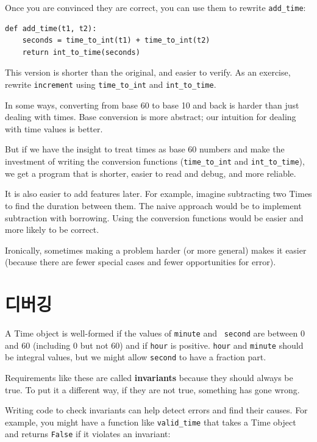 \documentclass[10pt]{book}
\begin{document}
Once you are convinced they are correct, you can use them to 
rewrite \verb"add_time":

\begin{verbatim}
def add_time(t1, t2):
    seconds = time_to_int(t1) + time_to_int(t2)
    return int_to_time(seconds)
\end{verbatim}
%
This version is shorter than the original, and easier to verify.  As
an exercise, rewrite {\tt increment} using \verb"time_to_int" and
\verb"int_to_time".

In some ways, converting from base 60 to base 10 and back is harder
than just dealing with times.  Base conversion is more abstract; our
intuition for dealing with time values is better.

But if we have the insight to treat times as base 60 numbers and make
the investment of writing the conversion functions (\verb"time_to_int"
and \verb"int_to_time"), we get a program that is shorter, easier to
read and debug, and more reliable.

It is also easier to add features later.  For example, imagine
subtracting two Times to find the duration between them.  The
naive approach would be to implement subtraction with borrowing.
Using the conversion functions would be easier and more likely to be
correct.

Ironically, sometimes making a problem harder (or more general) makes it
easier (because there are fewer special cases and fewer opportunities
for error).


\section{디버깅}

A Time object is well-formed if the values of {\tt minute} and {\tt
second} are between 0 and 60 (including 0 but not 60) and if 
{\tt hour} is positive.  {\tt hour} and {\tt minute} should be
integral values, but we might allow {\tt second} to have a
fraction part.

Requirements like these are called {\bf invariants} because
they should always be true.  To put it a different way, if they
are not true, something has gone wrong.

Writing code to check invariants can help detect errors
and find their causes.  For example, you might have a function
like \verb"valid_time" that takes a Time object and returns
{\tt False} if it violates an invariant:
\end{document}
